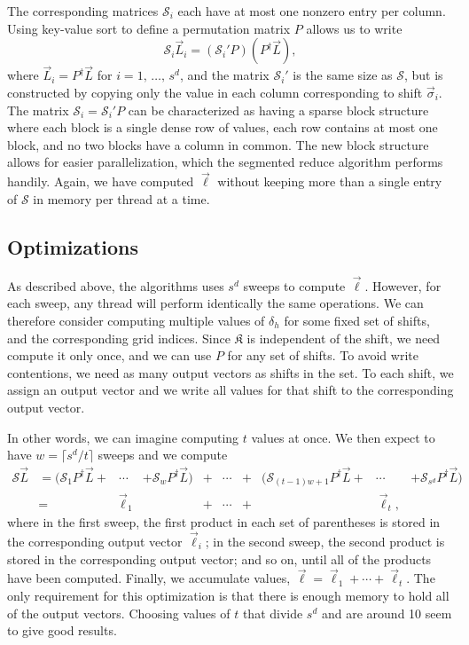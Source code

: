 The corresponding matrices $\mathcal{S}_i$ each have at most one nonzero entry
per column. Using key-value sort to define a permutation matrix $P$ allows us
to write
\begin{equation}
    \label{eq:submatrix}
    \mathcal{S}_i\vec{L}_i = (\mathcal{S}_i'P)(P^\dagger\vec{L}),
\end{equation}
where $\vec{L}_i=P^\dagger\vec{L}$ for $i=1,\,\ldots,\,s^d$, and the matrix
$\mathcal{S}_i'$ is the same size as $\mathcal{S}$, but is constructed by
copying only the value in each column corresponding to shift $\vec{\sigma}_i$.
The matrix $\mathcal{S}_i=\mathcal{S}_i'P$ can be characterized as having
a sparse block structure where each block is a single dense row of values, each
row contains at most one block, and no two blocks have a column in common. The
new block structure allows for easier parallelization, which the segmented
reduce algorithm performs handily. Again, we have computed $\vec{\ell}$ without
keeping more than a single entry of $\mathcal{S}$ in memory per thread at a
time.

\subsection{Optimizations}
As described above, the algorithms uses $s^d$ sweeps to compute $\vec{\ell}$.
However, for each sweep, any thread will perform identically the same
operations. We can therefore consider computing multiple values of $\delta_h$
for some fixed set of shifts, and the corresponding grid indices. Since
$\mathfrak{K}$ is independent of the shift, we need compute it only once, and
we can use $P$ for any set of shifts. To avoid write contentions, we need as
many output vectors as shifts in the set. To each shift, we assign an output
vector and we write all values for that shift to the corresponding output
vector.

In other words, we can imagine computing $t$ values at once. We then expect to 
have $w=\lceil s^d/t\rceil$ sweeps and we compute
\begin{equation}
    \label{eq:fused-sweeps}
    \begin{alignedat}{5}
        \mathcal{S}\vec{L} 
        &= (\mathcal{S}_1P^\dagger\vec{L} + &\cdots& + \mathcal{S}_wP^\dagger\vec{L})
        &+& \cdots
        &+& (\mathcal{S}_{(t-1)w+1}P^\dagger\vec{L} + &\cdots& + \mathcal{S}_{s^d}P^\dagger\vec{L}) \\
        &=& \vec{\ell}_1 &&+& \cdots &+&& \vec{\ell}_t, &
    \end{alignedat}
\end{equation}
where in the first sweep, the first product in each set of parentheses is
stored in the corresponding output vector $\vec{\ell}_i$; in the second sweep,
the second product is stored in the corresponding output vector; and so on,
until all of the products have been computed. Finally, we accumulate values,
$\vec{\ell} = \vec{\ell}_1 + \cdots + \vec{\ell}_t$. The only requirement for
this optimization is that there is enough memory to hold all of the output
vectors. Choosing values of $t$ that divide $s^d$ and are around 10 seem to
give good results.

